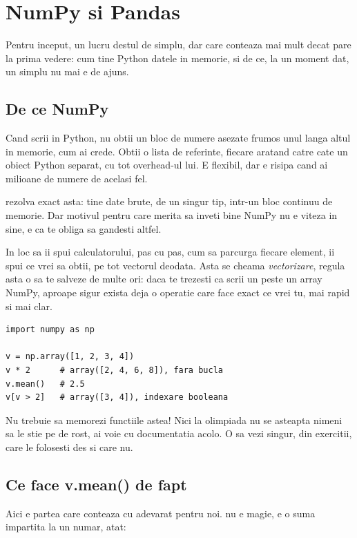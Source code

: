 \chapter{NumPy si Pandas}
\label{chapter:numpy-pandas}

Pentru inceput, un lucru destul de simplu, dar care conteaza mai mult decat pare la
prima vedere: cum tine Python datele in memorie, si de ce, la un moment
dat, un simplu  nu mai e de ajuns.

\section{De ce NumPy}

Cand scrii  in Python, nu obtii un bloc de numere
asezate frumos unul langa altul in memorie, cum ai crede. Obtii o lista de
referinte, fiecare aratand catre cate un obiect Python separat, cu tot
overhead-ul lui. E flexibil, dar e risipa cand ai milioane de numere de
acelasi fel.

 rezolva exact asta: tine date brute, de un singur
tip, intr-un bloc continuu de memorie. Dar motivul pentru care merita sa
inveti bine NumPy nu e viteza in sine, e ca te obliga sa gandesti altfel.

In loc sa ii spui calculatorului, pas cu pas, cum sa parcurga fiecare
element, ii spui ce vrei sa obtii, pe tot vectorul deodata. Asta se cheama
\textit{vectorizare}, regula asta o sa te salveze de multe
ori: daca te trezesti ca scrii un  peste un array NumPy,
aproape sigur exista deja o operatie care face exact ce vrei tu, mai
rapid si mai clar.

\begin{verbatim}
import numpy as np

v = np.array([1, 2, 3, 4])
v * 2      # array([2, 4, 6, 8]), fara bucla
v.mean()   # 2.5
v[v > 2]   # array([3, 4]), indexare booleana
\end{verbatim}

Nu trebuie sa memorezi functiile astea! Nici la olimpiada nu se
asteapta nimeni sa le stie pe de rost, ai voie cu documentatia acolo.
O sa vezi singur, din exercitii, care le folosesti des si care nu.

\section{Ce face v.mean() de fapt}

Aici e partea care conteaza cu adevarat pentru noi.  nu e
magie, e o suma impartita la un numar, atat:

